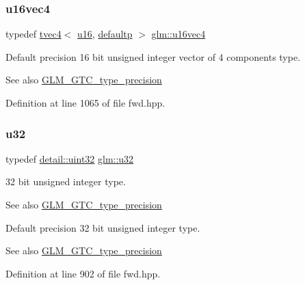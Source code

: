 \subsubsection{\texorpdfstring{u16vec4}{u16vec4}}
{\footnotesize\ttfamily typedef \mbox{\hyperlink{structglm_1_1tvec4}{tvec4}}$<$ \mbox{\hyperlink{group__gtc__type__precision_gae7a1571503f83d2264ddfa705a6b082a}{u16}}, \mbox{\hyperlink{namespaceglm_a0f04f086094c747d227af4425893f545a9d21ccd8b5a009ec7eb7677befc3bf51}{defaultp}} $>$ \mbox{\hyperlink{group__gtc__type__precision_ga87d1f39c523b4d6d4de0c2778afe5474}{glm\+::u16vec4}}}

Default precision 16 bit unsigned integer vector of 4 components type. \begin{DoxySeeAlso}{See also}
\mbox{\hyperlink{group__gtc__type__precision}{G\+L\+M\+\_\+\+G\+T\+C\+\_\+type\+\_\+precision}} 
\end{DoxySeeAlso}


Definition at line 1065 of file fwd.\+hpp.

\mbox{\label{group__gtc__type__precision_ga54e837745059fd29017bed71cfa0a8db}} 
\subsubsection{\texorpdfstring{u32}{u32}}
{\footnotesize\ttfamily typedef \mbox{\hyperlink{namespaceglm_1_1detail_ade6cfbf377022aaa391af8cd50489222}{detail\+::uint32}} \mbox{\hyperlink{group__gtc__type__precision_ga54e837745059fd29017bed71cfa0a8db}{glm\+::u32}}}

32 bit unsigned integer type. \begin{DoxySeeAlso}{See also}
\mbox{\hyperlink{group__gtc__type__precision}{G\+L\+M\+\_\+\+G\+T\+C\+\_\+type\+\_\+precision}}
\end{DoxySeeAlso}
Default precision 32 bit unsigned integer type. \begin{DoxySeeAlso}{See also}
\mbox{\hyperlink{group__gtc__type__precision}{G\+L\+M\+\_\+\+G\+T\+C\+\_\+type\+\_\+precision}} 
\end{DoxySeeAlso}


Definition at line 902 of file fwd.\+hpp.

\mbox{\label{group__gtc__type__precision_ga09dd72852808c32ba398674736b9672a}} 
